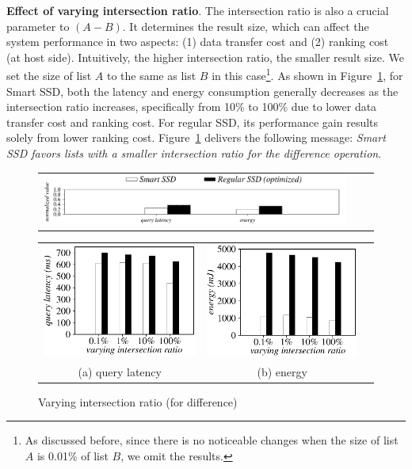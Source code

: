 \textbf{Effect of varying intersection ratio}.
The intersection ratio is also a crucial parameter to $(A-B)$. It determines the result size, which can affect the system performance in two aspects: (1) data transfer cost and (2) ranking cost (at host side). Intuitively, the higher intersection ratio, the smaller result size. We set the size of list $A$ to the same as list $B$ in this case\footnote{\small As discussed before, since there is no noticeable changes when the size of list $A$ is 0.01\% of list $B$, we omit the results.}. As shown in Figure~\ref{fig:varyInterRatioDifference}, for Smart SSD, both the latency and energy consumption generally decreases as the intersection ratio increases, specifically from 10\% to 100\% due to lower data transfer cost and ranking cost. For regular SSD, its performance gain results solely from lower ranking cost. Figure~\ref{fig:varyInterRatioDifference} delivers the following message: \emph{Smart SSD favors lists with a smaller intersection ratio for the \textsf{difference} operation}.

\begin{figure}[tbp]
\centering
\begin{tabular}{ccc}
\includegraphics[width=0.52\columnwidth]{figures/banner2.pdf}
\end{tabular}
\vspace{-0.1cm}
\renewcommand{\tabcolsep}{0.1mm}
\begin{tabular}{ccc}
\includegraphics[width=0.5\columnwidth]{figures/Difference-time-VaryInterRatio-equal.eps}&
\includegraphics[width=0.5\columnwidth]{figures/Difference-energy-VaryInterRatio-equal.eps}\\
(a) query latency & (b) energy
\end{tabular}
\caption{Varying intersection ratio (for difference)}
\label{fig:varyInterRatioDifference}
\end{figure}

